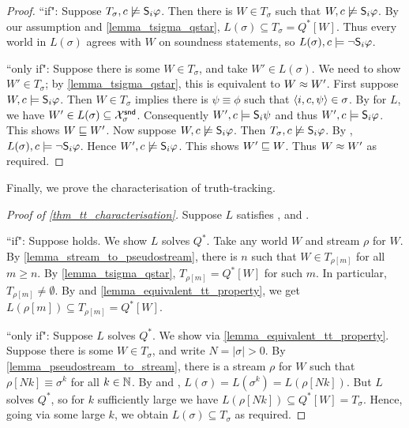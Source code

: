 \begin{proof}

    ``if": Suppose $T_\sigma, c \not\models \S_i\phi$. Then there is $W \in
    T_\sigma$ such that $W, c \not\models \S_i\phi$. By our assumption and
    \cref{lemma_tsigma_qstar}, $L(\sigma) \subseteq T_\sigma = Q^*[W]$. Thus
    every world in $L(\sigma)$ agrees with $W$ on soundness statements, so
    $L(\sigma), c \models \neg\S_i\phi$.

    ``only if": Suppose there is some $W \in T_\sigma$, and take $W' \in
    L(\sigma)$. We need to show $W' \in T_\sigma$; by
    \cref{lemma_tsigma_qstar}, this is equivalent to $W \speceq W'$.
    First suppose $W, c \models \S_i\phi$. Then $W \in T_\sigma$ implies there
    is $\psi \equiv \phi$ such that $\tuple{i, c, \psi} \in \sigma$. By
    \soundness{} for $L$, we have $W' \in L(\sigma) \subseteq \Xsnd_\sigma$.
    Consequently $W', c \models \S_i\psi$ and thus $W', c \models \S_i\phi$.
    This shows $W \specleq W'$.
    Now suppose $W, c \not\models \S_i\phi$. Then $T_\sigma, c \not\models
    \S_i\phi$. By \credulity{}, $L(\sigma), c
    \models \neg\S_i\phi$. Hence $W', c \not\models \S_i\phi$. This shows $W'
    \specleq W$. Thus $W \speceq W'$ as required.
\end{proof}

Finally, we prove the characterisation of truth-tracking.

\begin{proof}[Proof of \cref{thm_tt_characterisation}]
    Suppose $L$ satisfies \equivalence{}, \repetition{} and \soundness{}.

    ``if": Suppose \credulity{} holds. We show $L$
    solves $Q^*$. Take any world $W$ and stream $\rho$ for $W$.  By
    \cref{lemma_stream_to_pseudostream}, there is $n$ such that $W \in
    T_{\rho[m]}$ for all $m \ge n$. By \cref{lemma_tsigma_qstar}, $T_{\rho[m]}
    = Q^*[W]$ for such $m$. In particular, $T_{\rho[m]} \ne \emptyset$.  By
    \credulity{} and
    \cref{lemma_equivalent_tt_property}, we get $L(\rho[m]) \subseteq
    T_{\rho[m]} = Q^*[W]$.

    ``only if": Suppose $L$ solves $Q^*$. We show
    \credulity{} via
    \cref{lemma_equivalent_tt_property}. Suppose there is some $W \in
    T_\sigma$, and write $N = |\sigma| > 0$. By
    \cref{lemma_pseudostream_to_stream}, there is a stream $\rho$ for $W$ such
    that $\rho[Nk] \equiv \sigma^k$ for all $k \in \N$. By \repetition{} and
    \equivalence{}, $L(\sigma) = L(\sigma^k) = L(\rho[Nk])$. But $L$ solves
    $Q^*$, so for $k$ sufficiently large we have $L(\rho[Nk]) \subseteq Q^*[W]
    = T_\sigma$. Hence, going via some large $k$, we obtain $L(\sigma)
    \subseteq T_\sigma$ as required.
\end{proof}

